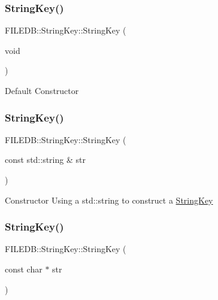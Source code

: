 \subsubsection{\texorpdfstring{StringKey()}{StringKey()}\hspace{0.1cm}{\footnotesize\ttfamily [1/8]}}
{\footnotesize\ttfamily F\+I\+L\+E\+D\+B\+::\+String\+Key\+::\+String\+Key (\begin{DoxyParamCaption}\item[{void}]{ }\end{DoxyParamCaption})}

Default Constructor \mbox{\label{classFILEDB_1_1StringKey_a18edda7351ebadd52d18bcde2cc8a71c}} 
\subsubsection{\texorpdfstring{StringKey()}{StringKey()}\hspace{0.1cm}{\footnotesize\ttfamily [2/8]}}
{\footnotesize\ttfamily F\+I\+L\+E\+D\+B\+::\+String\+Key\+::\+String\+Key (\begin{DoxyParamCaption}\item[{const std\+::string \&}]{str }\end{DoxyParamCaption})}

Constructor Using a std\+::string to construct a \mbox{\hyperlink{classFILEDB_1_1StringKey}{String\+Key}} \mbox{\label{classFILEDB_1_1StringKey_a7710b1f6cafd04e1e178d24019e81ae5}} 
\subsubsection{\texorpdfstring{StringKey()}{StringKey()}\hspace{0.1cm}{\footnotesize\ttfamily [3/8]}}
{\footnotesize\ttfamily F\+I\+L\+E\+D\+B\+::\+String\+Key\+::\+String\+Key (\begin{DoxyParamCaption}\item[{const char $\ast$}]{str }\end{DoxyParamCaption})}

\mbox{\label{classFILEDB_1_1StringKey_a042b0231e08bfbd9f9bc3802d95d0e9c}} 
